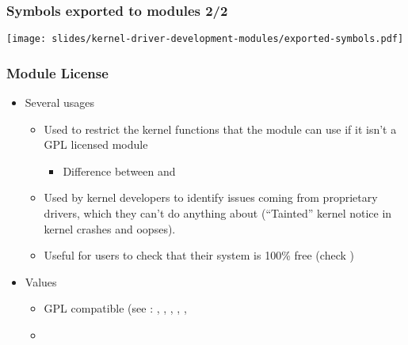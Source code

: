 \begin{frame}
  \frametitle{Symbols exported to modules 2/2}
  \begin{center}
    \texttt{[image: slides/kernel-driver-development-modules/exported-symbols.pdf]}
  \end{center}
\end{frame}

\begin{frame}
  \frametitle{Module License}
  \begin{itemize}
  \item Several usages
    \begin{itemize}
    \item Used to restrict the kernel functions that the module can
      use if it isn't a GPL licensed module
      \begin{itemize}
      \item Difference between  and
      \end{itemize}
    \item Used by kernel developers to identify issues coming from
      proprietary drivers, which they can't do anything about
      (“Tainted” kernel notice in kernel crashes and oopses).
    \item Useful for users to check that their system is 100\% free
      (check )
    \end{itemize}
  \item Values
    \begin{itemize}
    \item GPL compatible (see :
      , , ,
      , , 
    \item {}
    \end{itemize}
  \end{itemize}
\end{frame}

